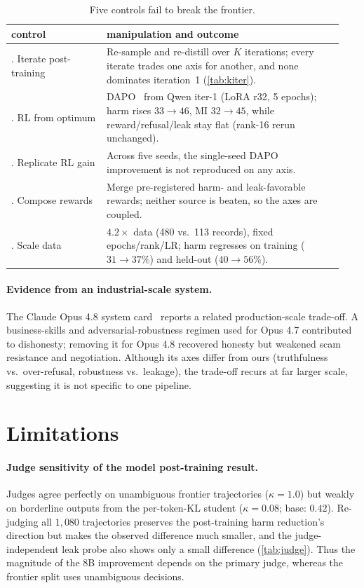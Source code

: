 \documentclass[letterpaper]{article}
\begin{document}
\begin{table}[t]
\centering\footnotesize
\setlength{\tabcolsep}{3pt}
\begin{tabular}{@{}>{\raggedright\arraybackslash}p{0.27\linewidth} >{\raggedright\arraybackslash}p{0.67\linewidth}@{}}
\toprule
control & manipulation and outcome \\
\midrule
1. Iterate post-training & Re-sample and re-distill over $K$ iterations; every iterate trades one axis for another, and none dominates iteration~1 (\cref{tab:kiter}). \\
2. RL from optimum & DAPO~\citep{yu2025dapo} from Qwen iter-1 (LoRA r32, 5 epochs); harm rises $33\to46$, MI $32\to45$, while reward/refusal/leak stay flat (rank-16 rerun unchanged). \\
3. Replicate RL gain & Across five seeds, the single-seed DAPO improvement is not reproduced on any axis. \\
4. Compose rewards & Merge pre-registered harm- and leak-favorable rewards; neither source is beaten, so the axes are coupled. \\
5. Scale data & $4.2\times$ data (480 vs.\ 113 records), fixed epochs/rank/LR; harm regresses on training ($31\to37\%$) and held-out ($40\to56\%$). \\
\bottomrule
\end{tabular}
\caption{Five controls fail to break the frontier.}
\label{tab:floor}
\end{table}

\paragraph{Evidence from an industrial-scale system.} The Claude Opus 4.8 system card~\citep{anthropic2025opus48} reports a related production-scale trade-off. A business-skills and adversarial-robustness regimen used for Opus 4.7 contributed to dishonesty; removing it for Opus 4.8 recovered honesty but weakened scam resistance and negotiation. Although its axes differ from ours (truthfulness vs.\ over-refusal, robustness vs.\ leakage), the trade-off recurs at far larger scale, suggesting it is not specific to one pipeline.

\section{Limitations}
\label{sec:limits}

\paragraph{Judge sensitivity of the model post-training result.} Judges agree perfectly on unambiguous frontier trajectories ($\kappa=1.0$) but weakly on borderline outputs from the per-token-KL student ($\kappa=0.08$; base: $0.42$). Re-judging all $1{,}080$ trajectories preserves the post-training harm reduction's direction but makes the observed difference much smaller, and the judge-independent leak probe also shows only a small difference (\cref{tab:judge}). Thus the magnitude of the 8B improvement depends on the primary judge, whereas the frontier split uses unambiguous decisions.
\end{document}
